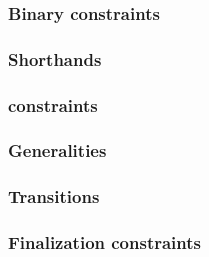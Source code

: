 \subsubsection{Binary constraints}                  \label{hub: system: system flags: binary constraints}             
\subsubsection{Shorthands}                          \label{hub: system: system flags: shorthands}                     
\subsubsection{\blockNumber{} constraints}          \label{hub: system: system flags: block number}                   
\subsubsection{Generalities}                        \label{hub: system: system flags: generalities}                   
\subsubsection{Transitions}                         \label{hub: system: system flags: transitions}                    
\subsubsection{Finalization constraints}            \label{hub: system: system flags: finalization}                   
